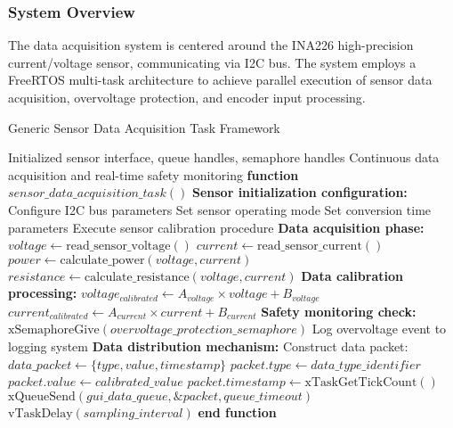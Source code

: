 \documentclass{article}
\begin{document}
\subsubsection{System Overview}

The data acquisition system is centered around the INA226 high-precision current/voltage sensor, communicating via I2C bus. The system employs a FreeRTOS multi-task architecture to achieve parallel execution of sensor data acquisition, overvoltage protection, and encoder input processing.

\begin{algorithm}
\caption{Generic Sensor Data Acquisition Task Framework}
\label{alg:sensor_data_acquisition}
\begin{algorithmic}[1]
\REQUIRE Initialized sensor interface, queue handles, semaphore handles
\ENSURE Continuous data acquisition and real-time safety monitoring
\STATE \textbf{function} $sensor\_data\_acquisition\_task()$
\STATE
\STATE \textbf{Sensor initialization configuration:}
\STATE Configure I2C bus parameters
\STATE Set sensor operating mode 
\STATE Set conversion time parameters 
\STATE Execute sensor calibration procedure
\STATE
{}
    \STATE \textbf{Data acquisition phase:}
    \STATE $voltage \leftarrow \text{read\_sensor\_voltage}()$
    \STATE $current \leftarrow \text{read\_sensor\_current}()$
    \STATE $power \leftarrow \text{calculate\_power}(voltage, current)$
    \STATE $resistance \leftarrow \text{calculate\_resistance}(voltage, current)$
    \STATE
    \STATE \textbf{Data calibration processing:}
    \STATE $voltage_{calibrated} \leftarrow A_{voltage} \times voltage + B_{voltage}$
    \STATE $current_{calibrated} \leftarrow A_{current} \times current + B_{current}$
    \STATE
    \STATE \textbf{Safety monitoring check:}
        \STATE $\text{xSemaphoreGive}(overvoltage\_protection\_semaphore)$ 
        \STATE Log overvoltage event to logging system
    \ENDIF
    \STATE
    \STATE \textbf{Data distribution mechanism:}
    \STATE Construct data packet: $data\_packet \leftarrow \{type, value, timestamp\}$
        \STATE $packet.type \leftarrow data\_type\_identifier$
        \STATE $packet.value \leftarrow calibrated\_value$
        \STATE $packet.timestamp \leftarrow \text{xTaskGetTickCount}()$
        \STATE $\text{xQueueSend}(gui\_data\_queue, \&packet, queue\_timeout)$
    \ENDFOR
    \STATE
    \STATE $\text{vTaskDelay}(sampling\_interval)$ 
\ENDWHILE
\STATE \textbf{end function}
\end{algorithmic}
\end{algorithm}
\end{document}
